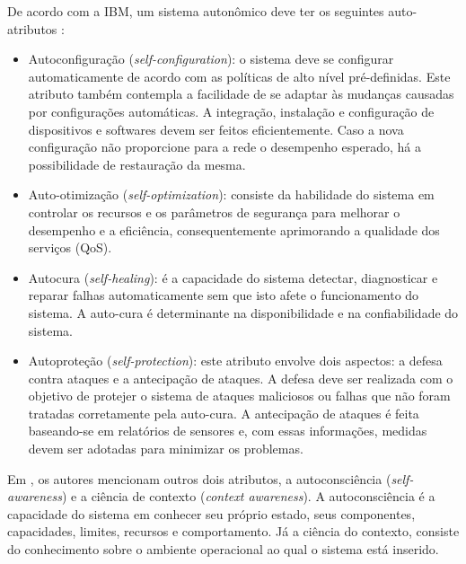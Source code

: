 \documentclass[tid,table]{texufpel} %
\begin{document}
De acordo com a IBM, um sistema autonômico deve ter os seguintes auto-atributos \cite{kephart03, iglesia15}: 

\begin{itemize}

\item Autoconfiguração (\textit{self-configuration}): o sistema deve se configurar automaticamente de acordo com as políticas de alto nível pré-definidas. Este atributo também contempla a facilidade de se adaptar às mudanças causadas por configurações automáticas. A integração, instalação e configuração de dispositivos e softwares devem ser feitos eficientemente. Caso a nova configuração não proporcione para a rede o desempenho esperado, há a possibilidade de restauração da mesma.

\item Auto-otimização (\textit{self-optimization}): consiste da habilidade do sistema em controlar os recursos e os parâmetros de segurança para melhorar o desempenho e a eficiência, consequentemente aprimorando a qualidade dos serviços (QoS).

\item Autocura (\textit{self-healing}): é a capacidade do sistema detectar, diagnosticar e reparar falhas automaticamente sem que isto afete o funcionamento do sistema. A auto-cura é determinante na disponibilidade e na confiabilidade do sistema.

\item Autoproteção (\textit{self-protection}): este atributo envolve dois aspectos: a defesa contra ataques e a antecipação de ataques. A defesa deve ser realizada com o objetivo de protejer o sistema de ataques maliciosos ou falhas que não foram tratadas corretamente pela auto-cura. A antecipação de ataques é feita baseando-se em relatórios de sensores e, com essas informações, medidas devem ser adotadas para minimizar os problemas.

\end{itemize}

Em \cite{evesti13b}, os autores mencionam outros dois atributos, a autoconsciência (\textit{self-awareness}) e a ciência de contexto (\textit{context awareness}). A autoconsciência é a capacidade do sistema em conhecer seu próprio estado, seus componentes, capacidades, limites, recursos e comportamento. Já a ciência do contexto, consiste do conhecimento sobre o ambiente operacional ao qual o sistema está inserido. 


\end{document}
